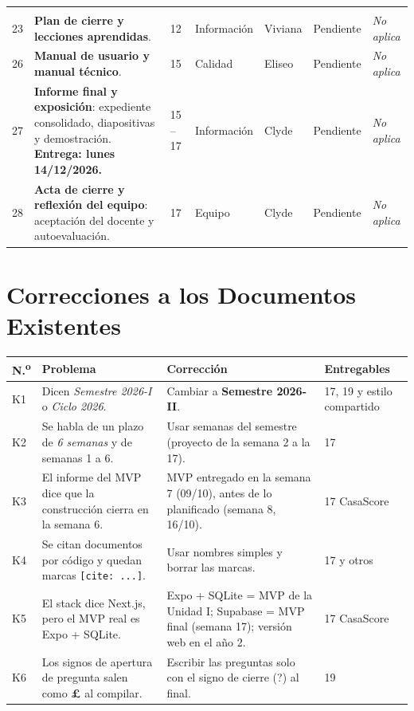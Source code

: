 \documentclass[11pt,a4paper]{article}
\newcommand{\pendiente}{\textcolor{GrisOscuro}{Pendiente}}
\newcommand{\noaplica}{\textcolor{GrisOscuro}{\textit{No aplica}}}
\begin{document}
{\begin{longtable}{@{}C{0.7cm} >{\raggedright\arraybackslash}p{6.55cm} C{1.0cm} P{2.25cm} P{1.35cm} C{1.7cm} C{1.7cm}@{}}
 \\
23 & \textbf{Plan de cierre y lecciones aprendidas}. & 12 & Información & Viviana & \pendiente & \noaplica \\
26 & \textbf{Manual de usuario y manual técnico}. & 15 & Calidad & Eliseo & \pendiente & \noaplica \\
27 & \textbf{Informe final y exposición}: expediente consolidado, diapositivas y demostración. \textbf{Entrega: lunes 14/12/2026.} & 15 -- 17 & Información & Clyde & \pendiente & \noaplica \\
28 & \textbf{Acta de cierre y reflexión del equipo}: aceptación del docente y autoevaluación. & 17 & Equipo & Clyde & \pendiente & \noaplica \\
\end{longtable}
}



\section{Correcciones a los Documentos Existentes}

{\small
\noindent\begin{tabularx}{\textwidth}{@{}C{0.6cm} L L P{2.2cm}@{}}
\toprule
{}
\textbf{N.\textsuperscript{o}} & \textbf{Problema} & \textbf{Corrección} & \textbf{Entregables} \\
\midrule
K1 & Dicen \textit{Semestre 2026-I} o \textit{Ciclo 2026}. & Cambiar a \textbf{Semestre 2026-II}. & 17, 19 y estilo compartido \\
K2 & Se habla de un plazo de \textit{6 semanas} y de semanas 1 a 6. & Usar semanas del semestre (proyecto de la semana 2 a la 17). & 17 \\
K3 & El informe del MVP dice que la construcción cierra en la semana 6. & MVP entregado en la semana 7 (09/10), antes de lo planificado (semana 8, 16/10). & 17 CasaScore \\
K4 & Se citan documentos por código y quedan marcas \texttt{[cite: ...]}. & Usar nombres simples y borrar las marcas. & 17 y otros \\
K5 & El stack dice Next.js, pero el MVP real es Expo + SQLite. & Expo + SQLite = MVP de la Unidad I; Supabase = MVP final (semana 17); versión web en el año 2. & 17 CasaScore \\
K6 & Los signos de apertura de pregunta salen como \textbf{£} al compilar. & Escribir las preguntas solo con el signo de cierre (?) al final. & 19 \\
\bottomrule
\end{tabularx}
}
\end{document}
